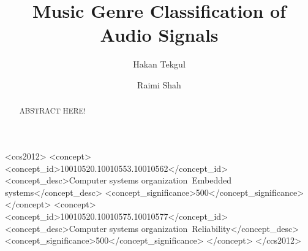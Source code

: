 \documentclass[sigconf]{acmart}
\begin{document}
\title{Music Genre Classification of Audio Signals}

\author{Hakan Tekgul}
\affiliation
{%
}

\author{Raimi Shah}




\begin{abstract}
ABSTRACT HERE!
\end{abstract}

%
%

\begin{CCSXML}
<ccs2012>
<concept>
<concept_id>10010520.10010553.10010562</concept_id>
<concept_desc>Computer systems organization~Embedded systems</concept_desc>
<concept_significance>500</concept_significance>
</concept>
<concept>
<concept_id>10010520.10010575.10010577</concept_id>
<concept_desc>Computer systems organization~Reliability</concept_desc>
<concept_significance>500</concept_significance>
</concept>
</ccs2012>
\end{CCSXML}






\maketitle





\end{document}
